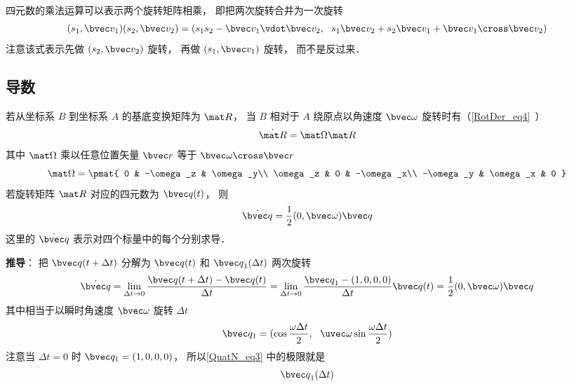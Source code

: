四元数的乘法运算可以表示两个旋转矩阵相乘， 即把两次旋转合并为一次旋转
\begin{equation}
(s_1, \bvec v_1) (s_2, \bvec v_2) = (s_1 s_2 - \bvec v_1 \vdot \bvec v_2,\ \ s_1 \bvec v_2 + s_2 \bvec v_1 + \bvec v_1 \cross \bvec v_2)
\end{equation}
注意该式表示先做 $(s_2, \bvec v_2)$ 旋转， 再做 $(s_1, \bvec v_1)$ 旋转， 而不是反过来．

\subsection{导数}
若从坐标系 $B$ 到坐标系 $A$ 的基底变换矩阵为 $\mat R$， 当 $B$ 相对于 $A$ 绕原点以角速度 $\bvec \omega$ 旋转时有（\autoref{RotDer_eq4}~）
\begin{equation}
\dot{\mat R} = \mat \Omega \mat R
\end{equation}
其中 $\mat\Omega$ 乘以任意位置矢量 $\bvec r$ 等于 $\bvec \omega \cross \bvec r$
\begin{equation}
\mat \Omega = \pmat{
0 & -\omega_z & \omega_y\\
\omega_z & 0 & -\omega_x\\
-\omega_y & \omega_x & 0
}\end{equation}
若旋转矩阵 $\mat R$ 对应的四元数为 $\bvec q(t)$， 则
\begin{equation}\label{QuatN_eq1}
\dot {\bvec q} = \frac12 (0, \bvec \omega) \bvec q
\end{equation}
这里的 $\dot{\bvec q}$ 表示对四个标量中的每个分别求导．

\textbf{推导}： 把 ${\bvec q}(t+\Delta t)$ 分解为 ${\bvec q}(t)$ 和 ${\bvec q}_1(\Delta t)$ 两次旋转
\begin{equation}\label{QuatN_eq3}
\dot {\bvec q}
= \lim_{\Delta t\to 0}\frac{{\bvec q}(t+\Delta t) - {\bvec q}(t)}{\Delta t}
= \lim_{\Delta t\to 0}\frac{{\bvec q}_1 - (1,0,0,0)}{\Delta t}\bvec q(t)
= \frac{1}{2} (0, \bvec \omega)\bvec q
\end{equation}
其中相当于以瞬时角速度 $\bvec \omega$ 旋转 $\Delta t$
\begin{equation}
{\bvec q_1} = (\cos\frac{\omega\Delta t}{2},\ \ \uvec \omega \sin\frac{\omega\Delta t}{2})
\end{equation}
注意当 $\Delta t = 0$ 时 $\bvec q_1 = (1,0,0,0)$， 所以\autoref{QuatN_eq3} 中的极限就是
\begin{equation}
{\bvec q}_1(\Delta t)
\end{equation}

